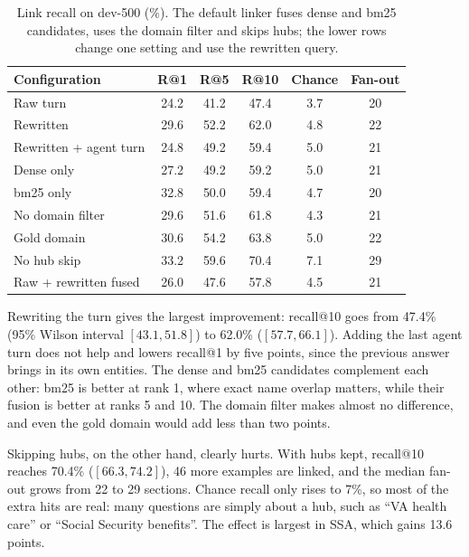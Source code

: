 \begin{table}[ht]
    \centering
    \caption{Link recall on dev-500 (\%). The default linker fuses dense and \gls{bm25}
    candidates, uses the domain filter and skips hubs; the lower rows change one setting
    and use the rewritten query.}
    \label{tab:kgret:linking}
    \begin{tabular}{lccccc}
        \toprule
        Configuration & R@1 & R@5 & R@10 & Chance & Fan-out \\
        \midrule
        Raw turn                 & 24.2 & 41.2 & 47.4 & 3.7 & 20 \\
        Rewritten                & 29.6 & 52.2 & 62.0 & 4.8 & 22 \\
        Rewritten + agent turn   & 24.8 & 49.2 & 59.4 & 5.0 & 21 \\
        \midrule
        Dense only               & 27.2 & 49.2 & 59.2 & 5.0 & 21 \\
        \gls{bm25} only          & 32.8 & 50.0 & 59.4 & 4.7 & 20 \\
        No domain filter         & 29.6 & 51.6 & 61.8 & 4.3 & 21 \\
        Gold domain              & 30.6 & 54.2 & 63.8 & 5.0 & 22 \\
        No hub skip              & 33.2 & 59.6 & 70.4 & 7.1 & 29 \\
        Raw + rewritten fused    & 26.0 & 47.6 & 57.8 & 4.5 & 21 \\
        \bottomrule
    \end{tabular}
\end{table}

Rewriting the turn gives the largest improvement: recall@10 goes from 47.4\% (95\% Wilson
interval $[43.1, 51.8]$) to 62.0\% ($[57.7, 66.1]$). Adding the last agent turn does not
help and lowers recall@1 by five points, since the previous answer brings in its own
entities. The dense and \gls{bm25} candidates complement each other: \gls{bm25} is better
at rank 1, where exact name overlap matters, while their fusion is better at ranks 5 and
10. The domain filter makes almost no difference, and even the gold domain would add
less than two points.

Skipping hubs, on the other hand, clearly hurts. With hubs kept, recall@10 reaches
70.4\% ($[66.3, 74.2]$), 46 more examples are linked, and the median fan-out grows from
22 to 29 sections. Chance recall only rises to 7\%, so most of the extra hits are real:
many questions are simply about a hub, such as ``VA health care'' or ``Social Security
benefits''. The effect is largest in SSA, which gains 13.6 points.

